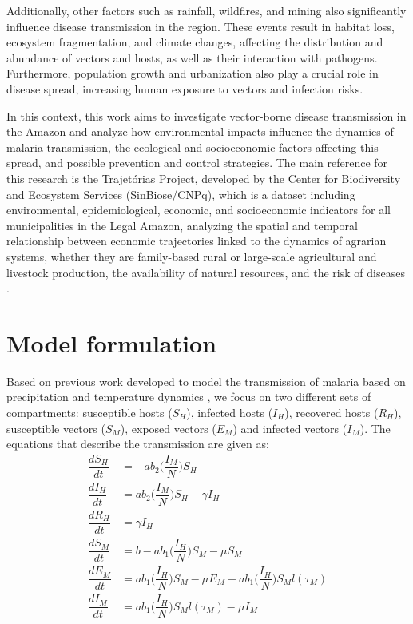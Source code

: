 \documentclass[a4paper,fleqn]{cas-dc}
\begin{document}
Additionally, other factors such as rainfall, wildfires, and mining 
also significantly influence disease transmission in the region. These 
events result in habitat loss, ecosystem fragmentation, and climate 
changes, affecting the distribution and abundance of vectors and hosts, 
as well as their interaction with pathogens. Furthermore, population growth 
and urbanization also play a crucial role in disease spread, increasing 
human exposure to vectors and infection risks.

In this context, this work aims to investigate vector-borne disease 
transmission in the Amazon and analyze how environmental impacts 
influence the dynamics of malaria transmission, the ecological and 
socioeconomic factors affecting this spread, and possible prevention 
and control strategies. The main reference for this research is the 
Trajetórias Project, developed by the Center for Biodiversity and 
Ecosystem Services (SinBiose/CNPq), which is a dataset including 
environmental, epidemiological, economic, and socioeconomic indicators 
for all municipalities in the Legal Amazon, analyzing the spatial and 
temporal relationship between economic trajectories linked to the dynamics 
of agrarian systems, whether they are family-based rural or large-scale 
agricultural and livestock production, the availability of natural resources, 
and the risk of diseases \cite{Rorato2023}.

\section{Model formulation}

Based on previous work developed to model the transmission of malaria based on precipitation and temperature dynamics \cite{Parham2010}, we focus on two different sets of compartments: susceptible hosts ($S_H$), infected hosts ($I_H$), recovered hosts ($R_H$), susceptible vectors ($S_M$), exposed vectors ($E_M$) and infected vectors ($I_M$). The equations that describe the transmission are given as:
\begin{align}
\dfrac{dS_H}{dt} & = -ab_2\bigg(\dfrac{I_M}{N}\bigg)S_H \label{eq1}\\
\dfrac{dI_H}{dt} & = ab_2\bigg(\dfrac{I_M}{N}\bigg)S_H - \gamma I_H \label{eq2}\\
\dfrac{dR_H}{dt} & = \gamma I_H \label{eq3}\\
\dfrac{dS_M}{dt} & = b - ab_1\bigg(\dfrac{I_H}{N}\bigg)S_M - \mu S_M \label{eq4}\\
\dfrac{dE_M}{dt} & = ab_1\bigg(\dfrac{I_H}{N}\bigg)S_M - \mu E_M - ab_1\bigg(\dfrac{I_H}{N}\bigg)S_Ml(\tau_M) \label{eq5}\\
\dfrac{dI_M}{dt} & = ab_1\bigg(\dfrac{I_H}{N}\bigg)S_Ml(\tau_M) - \mu I_M \label{eq6}
\end{align}
\end{document}
